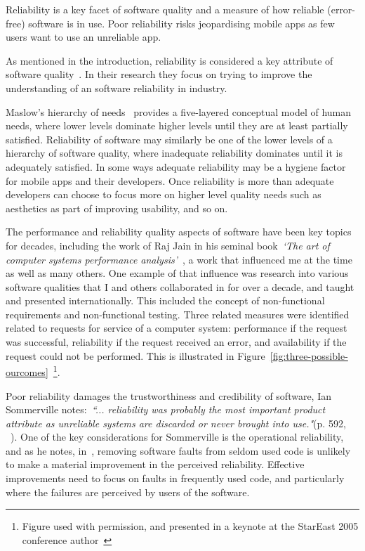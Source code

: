 Reliability is a key facet of software quality and a measure of how reliable (error-free) software is in use. Poor reliability risks jeopardising mobile apps as few users want to use an unreliable app. 

As mentioned in the introduction, reliability is considered a key attribute of software quality~\citep{febrero2017_software_reliability_as_user_perception}. In their research they focus on trying to improve the understanding of an software reliability in industry. 

Maslow's hierarchy of needs~\citep{maslow1943_a_dynamic_theory_of_human_motivation} provides a five-layered conceptual model of human needs, where lower levels dominate higher levels until they are at least partially satisfied. Reliability of software may similarly be one of the lower levels of a hierarchy of software quality, where inadequate reliability dominates until it is adequately satisfied. In some ways adequate reliability may be a hygiene factor for mobile apps and their developers. Once reliability is more than adequate developers can choose to focus more on higher level quality needs such as aesthetics as part of improving usability, and so on.

The performance and reliability quality aspects of software have been key topics for decades, including the work of Raj Jain in his seminal book~\emph{`The art of computer systems performance analysis'}~\cite{jain1991art}, a work that influenced me at the time as well as many others. One example of that influence was research into various software qualities that I and others collaborated in for over a decade, and taught and presented internationally. This included the concept of non-functional requirements and non-functional testing. Three related measures were identified related to requests for service of a computer system: performance if the request was successful, reliability if the request received an error, and availability if the request could not be performed. This is illustrated in Figure~\ref{fig:three-possible-ourcomes}~\footnote{Figure used with permission, and presented in a keynote at the StarEast 2005 conference author~\cite{harty_stareast2005_keynote}}. 

Poor reliability damages the trustworthiness and credibility of software, Ian Sommerville notes:~\emph{``... reliability was probably the most important product attribute as unreliable systems are discarded or never brought into use."}(p. 592, ~\cite{sommerville1989_software_engineering}). One of the key considerations for Sommerville is the operational reliability, and as he notes, in~\cite{mills1987_cleanroom_software_engineering}, removing software faults from seldom used code is unlikely to make a material improvement in the perceived reliability. Effective improvements need to focus on faults in frequently used code, and particularly where the failures are perceived by users of the software.


